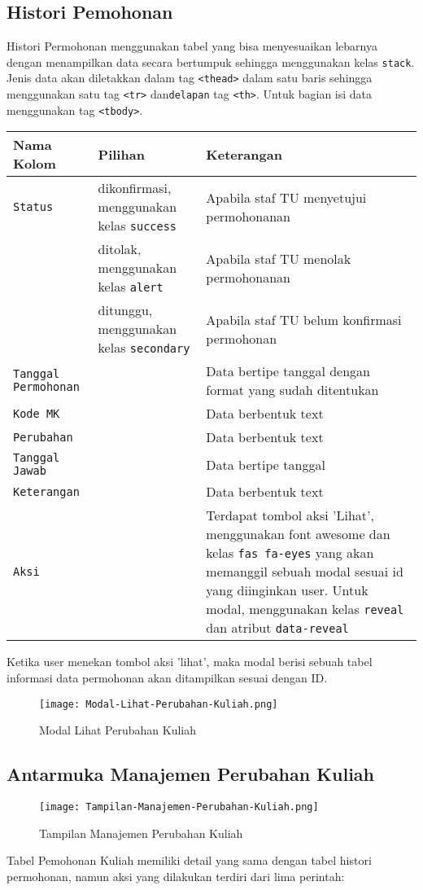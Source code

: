 \subsection{Histori Pemohonan}
Histori Permohonan menggunakan tabel yang bisa menyesuaikan lebarnya dengan menampilkan data secara bertumpuk sehingga menggunakan kelas \texttt{stack}. Jenis data akan diletakkan dalam tag \texttt{<thead>} dalam satu baris sehingga menggunakan satu tag \texttt{<tr>} dan\texttt{delapan} tag \texttt{<th>}. Untuk bagian isi data menggunakan tag \texttt{<tbody>}.
\begin{tabular}{ |p{4cm}|p{2cm}|p{10cm}|  }
	\hline
	Nama Kolom & Pilihan & Keterangan\\
	\hline
	\texttt{Status} & dikonfirmasi, menggunakan kelas \verb|success| & Apabila staf TU menyetujui permohonanan\\
	\hline
	&  ditolak, menggunakan kelas \verb|alert|  & Apabila staf TU menolak permohonanan\\
	\hline
	& ditunggu, menggunakan kelas \verb|secondary| &  Apabila staf TU belum konfirmasi permohonan \\
	\hline
	\texttt{Tanggal Permohonan}    & & Data bertipe tanggal dengan format yang sudah ditentukan\\
	\hline
	\texttt{Kode MK} &  & Data berbentuk text \\
	\hline
	\texttt{Perubahan} &  & Data berbentuk text \\
	\hline
	\texttt{Tanggal Jawab} &  & Data bertipe tanggal \\
	\hline
	\texttt{Keterangan} &  & Data berbentuk text \\
	\hline
	\texttt{Aksi} &  & Terdapat tombol aksi 'Lihat', menggunakan font awesome dan kelas \verb|fas fa-eyes| yang akan memanggil sebuah modal sesuai id yang diinginkan user. Untuk modal, menggunakan kelas \texttt{reveal} dan atribut \texttt{data-reveal}\\
	\hline
\end{tabular}
Ketika user menekan tombol aksi 'lihat', maka modal berisi sebuah tabel informasi data permohonan akan ditampilkan sesuai dengan ID.
\begin{figure} [H]
	\centering  
	\texttt{[image: Modal-Lihat-Perubahan-Kuliah.png]}  
	\caption{Modal Lihat Perubahan Kuliah} 
\end{figure}

\subsection{Antarmuka Manajemen Perubahan Kuliah}
\begin{figure} [H]
	\centering  
	\texttt{[image: Tampilan-Manajemen-Perubahan-Kuliah.png]}  
	\caption{Tampilan Manajemen Perubahan Kuliah} 
\end{figure}
Tabel Pemohonan Kuliah memiliki detail yang sama dengan tabel histori permohonan, namun aksi yang dilakukan terdiri dari lima perintah:

